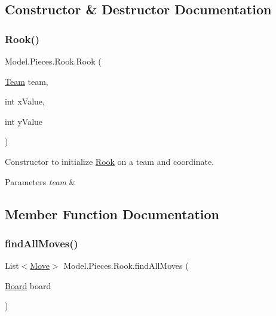 \subsection{Constructor \& Destructor Documentation}
\hypertarget{class_model_1_1_pieces_1_1_rook_a3e60b56c0706a1a9bb3e02649cc91182}{}\label{class_model_1_1_pieces_1_1_rook_a3e60b56c0706a1a9bb3e02649cc91182} 
\subsubsection{\texorpdfstring{Rook()}{Rook()}}
{\footnotesize\ttfamily Model.\+Pieces.\+Rook.\+Rook (\begin{DoxyParamCaption}\item[{\hyperlink{class_model_1_1_team}{Team}}]{team,  }\item[{int}]{x\+Value,  }\item[{int}]{y\+Value }\end{DoxyParamCaption})}

Constructor to initialize \hyperlink{class_model_1_1_pieces_1_1_rook}{Rook} on a team and coordinate. 
\begin{DoxyParams}{Parameters}
{\em team} & \\
\hline
\end{DoxyParams}


\subsection{Member Function Documentation}
\hypertarget{class_model_1_1_pieces_1_1_rook_adf3f76fc3283bbe0b357e05fd0b3ffb8}{}\label{class_model_1_1_pieces_1_1_rook_adf3f76fc3283bbe0b357e05fd0b3ffb8} 
\subsubsection{\texorpdfstring{find\+All\+Moves()}{findAllMoves()}}
{\footnotesize\ttfamily List$<$\hyperlink{class_model_1_1_move}{Move}$>$ Model.\+Pieces.\+Rook.\+find\+All\+Moves (\begin{DoxyParamCaption}\item[{\hyperlink{class_model_1_1_board}{Board}}]{board }\end{DoxyParamCaption})}


